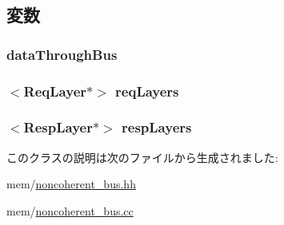 \subsection{変数}
\hypertarget{classNoncoherentBus_a7040fa8d9fb24afb9f4fe245b135da19}{
\subsubsection[{dataThroughBus}]{ {\bf dataThroughBus}}}
\label{classNoncoherentBus_a7040fa8d9fb24afb9f4fe245b135da19}
\hypertarget{classNoncoherentBus_ab124575386549f77de080cd9fcaf2ba0}{
\subsubsection[{reqLayers}]{$<${\bf ReqLayer}$\ast$$>$ {\bf reqLayers}}}
\label{classNoncoherentBus_ab124575386549f77de080cd9fcaf2ba0}
\hypertarget{classNoncoherentBus_a2f42dda70e78f1e5e9574f11b465d173}{
\subsubsection[{respLayers}]{$<${\bf RespLayer}$\ast$$>$ {\bf respLayers}}}
\label{classNoncoherentBus_a2f42dda70e78f1e5e9574f11b465d173}


このクラスの説明は次のファイルから生成されました:\begin{DoxyCompactItemize}
\item 
mem/\hyperlink{noncoherent__bus_8hh}{noncoherent\_\-bus.hh}\item 
mem/\hyperlink{noncoherent__bus_8cc}{noncoherent\_\-bus.cc}\end{DoxyCompactItemize}
